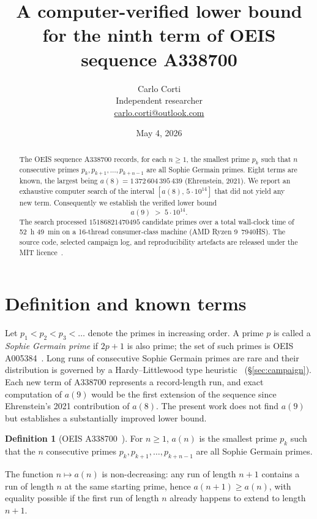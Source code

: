 \documentclass[11pt,a4paper]{article}
\title{A computer-verified lower bound for the ninth term of OEIS sequence A338700}
\author{Carlo Corti \\[0.4ex]
\small Independent researcher \\[0.2ex]
\small \href{mailto:carlo.corti@outlook.com}{carlo.corti@outlook.com}}
\date{May 4, 2026}
\theoremstyle{definition}
\newtheorem{definition}{Definition}
\begin{document}
\maketitle

\begin{abstract}
The OEIS sequence A338700 records, for each $n\ge 1$, the smallest prime
$p_k$ such that $n$ consecutive primes $p_k, p_{k+1}, \ldots, p_{k+n-1}$
are all Sophie Germain primes. Eight terms are known, the largest being
$a(8) = 1\,372\,604\,395\,439$ (Ehrenstein, 2021). We report an exhaustive
computer search of the interval $[a(8),\,5\cdot 10^{14}]$ that did not
yield any new term. Consequently we establish the verified lower bound
\[
  a(9) \;>\; 5 \cdot 10^{14}.
\]
The search processed $\num{15186821470495}$ candidate primes over a total
wall-clock time of 52~h 49~min on a 16-thread consumer-class machine
(AMD Ryzen 9~7940HS). The source code, selected campaign log, and reproducibility artefacts are released under the MIT licence~\cite{repo}.
\end{abstract}

\section{Definition and known terms}

Let $p_1 < p_2 < p_3 < \ldots$ denote the primes in increasing order.
A prime $p$ is called a \emph{Sophie Germain prime} if $2p+1$ is also
prime; the set of such primes is OEIS A005384~\cite{oeis-a005384}.
Long runs of consecutive Sophie Germain primes are rare and their
distribution is governed by a Hardy--Littlewood type heuristic~\cite{hardy-littlewood}
(§\ref{sec:campaign}). Each new term of A338700 represents a
record-length run, and exact computation of $a(9)$ would be the first
extension of the sequence since Ehrenstein's 2021 contribution of $a(8)$.
The present work does not find $a(9)$ but establishes a substantially
improved lower bound.

\begin{definition}[OEIS A338700~\cite{oeis-a338700}]
For $n \ge 1$, $a(n)$ is the smallest prime $p_k$ such that the $n$
consecutive primes $p_k, p_{k+1}, \ldots, p_{k+n-1}$ are all Sophie
Germain primes.
\end{definition}

The function $n \mapsto a(n)$ is non-decreasing: any run of length $n+1$
contains a run of length $n$ at the same starting prime, hence
$a(n+1) \ge a(n)$, with equality possible if the first run of length $n$
already happens to extend to length $n+1$.
\end{document}

